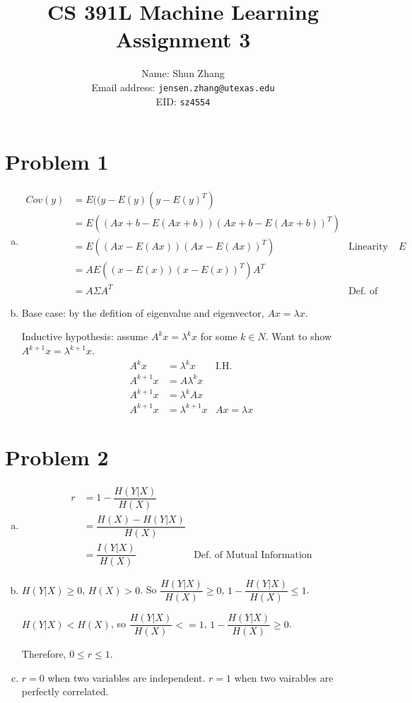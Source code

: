 \documentclass[10pt]{article}
\title{CS 391L Machine Learning Assignment 3}
\author{Name: Shun Zhang\\
Email address: \texttt{jensen.zhang@utexas.edu}\\
EID: \texttt{sz4554}}
\date{}
\begin{document}
\maketitle

\section*{Problem 1}

\begin{enumerate}[(a)]

\item \begin{align}
Cov(y) &= E((y - E(y)(y - E(y)^T)\\
&= E((Ax + b - E(Ax + b))(Ax + b - E(Ax + b))^T)\\
&= E((Ax - E(Ax))(Ax - E(Ax))^T) &\text{Linearity of $E$}\\
&= AE((x - E(x))(x - E(x))^T)A^T\\
&= A\Sigma A^T &\text{Def.\ of Cov.\ }
\end{align}

\item Base case: by the defition of eigenvalue and eigenvector, $Ax =
\lambda x$.

Inductive hypothesis: assume $A^k x = \lambda^k x$ for some $k \in N$.
Want to show $A^{k+1} x = \lambda^{k+1} x$.
\begin{align}
A^k x &= \lambda^k x &\text{I.H.}\\
A^{k+1} x &= A \lambda^k x\\
A^{k+1} x &= \lambda^k Ax\\
A^{k+1} x &= \lambda^{k+1} x &Ax = \lambda x
\end{align}

\end{enumerate}

\section*{Problem 2}

\begin{enumerate}[(a)]

\item 
\begin{align}
r &= 1 - \dfrac{H(Y|X)}{H(X)}\\
&= \dfrac{H(X) - H(Y|X)}{H(X)}\\
&= \dfrac{I(Y|X)}{H(X)} &\text{Def.\ of Mutual Information}
\end{align}

\item $H(Y|X) \geq 0$, $H(X) > 0$. So $\dfrac{H(Y|X)}{H(X)} \geq 0$,
$1 - \dfrac{H(Y|X)}{H(X)} \leq 1$.

$H(Y|X) < H(X)$, so $\dfrac{H(Y|X)}{H(X)} <= 1$, $1 -
\dfrac{H(Y|X)}{H(X)} \geq 0$.

Therefore, $0 \leq r \leq 1$.

\item $r = 0$ when two variables are independent. $r = 1$ when two
vairables are perfectly correlated.

\end{enumerate}
\end{document}
